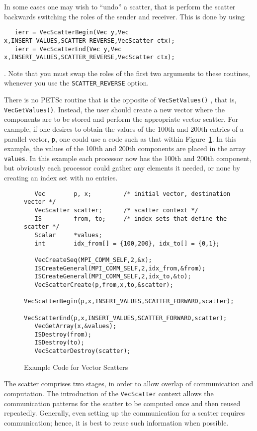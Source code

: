 In some cases one may wish to ``undo'' a scatter, that is perform the 
scatter backwards switching the roles of the sender and receiver. This is 
done by using 
\begin{verbatim}
   ierr = VecScatterBegin(Vec y,Vec x,INSERT_VALUES,SCATTER_REVERSE,VecScatter ctx);
   ierr = VecScatterEnd(Vec y,Vec x,INSERT_VALUES,SCATTER_REVERSE,VecScatter ctx);
\end{verbatim} 
. Note that you must swap the roles of the first 
two arguments to these routines, whenever you use the {\tt SCATTER\_REVERSE}
option.

 
There is no PETSc routine that is the opposite of {\tt VecSetValues()}
, that is, {\tt VecGetValues()}. 
Instead, the user should create a new vector where
the components are to be stored and perform the appropriate vector 
scatter. For example, if one desires to obtain the values of the 
100th and 200th entries of a parallel vector, {\tt p}, one could use 
a code such as that within Figure~\ref{fig:vecscatter}.
In this example, the values of the 100th and 200th components are
placed in the array 
{\tt values}. In this example each processor now has the 100th and 
200th component, but obviously each processor could gather any 
elements it needed, or none by creating an index set with no entries.

\begin{figure}[tb]
\begin{verbatim}
   Vec        p, x;         /* initial vector, destination vector */
   VecScatter scatter;      /* scatter context */
   IS         from, to;     /* index sets that define the scatter */
   Scalar     *values;
   int        idx_from[] = {100,200}, idx_to[] = {0,1};

   VecCreateSeq(MPI_COMM_SELF,2,&x);
   ISCreateGeneral(MPI_COMM_SELF,2,idx_from,&from);
   ISCreateGeneral(MPI_COMM_SELF,2,idx_to,&to);
   VecScatterCreate(p,from,x,to,&scatter);
   VecScatterBegin(p,x,INSERT_VALUES,SCATTER_FORWARD,scatter);
   VecScatterEnd(p,x,INSERT_VALUES,SCATTER_FORWARD,scatter);
   VecGetArray(x,&values);
   ISDestroy(from);
   ISDestroy(to); 
   VecScatterDestroy(scatter);
\end{verbatim}
\caption{Example Code for Vector Scatters}
\label{fig:vecscatter}
\end{figure}

The scatter comprises two stages, in order to allow overlap of 
communication and computation. The introduction of the 
{\tt VecScatter} context allows the communication patterns for the scatter
to be computed once and then reused repeatedly. Generally, even 
setting up the communication for a scatter requires communication; 
hence, it is best to reuse such information when possible.

